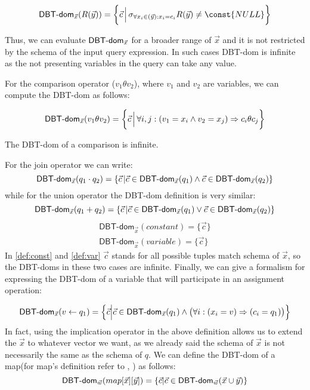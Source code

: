 \documentclass[12pt]{article}
\newcommand{\dom}{\textsf{DBT-dom}}
\begin{document}
\begin{equation}
\label{def:relation}
\dom{}_{\vec x}(R(\vec y))=\bigg\{\vec c\,\Big|\,\sigma_{\forall x_i\in(\vec{y}): x_{i}=c_{i}}R(\vec y)\not= \const{NULL}\bigg\}
\end{equation}

Thus, we can evaluate $\text{\dom}_{\vec{x}}$ for a broader range of $\vec{x}$ and it is not restricted by the schema of the input query expression. In such cases \dom{} is infinite as the not presenting variables in the query can take any value.

For the comparison operator ($v_{1}\theta v_{2}$), where $v_1$ and $v_2$ are variables, we can compute the \dom{} as follows:

\begin{equation}
\text{\dom{}}_{\vec{x}}(v_{1}\theta v_{2})=\bigg\{\vec{c}\,\Big|\,\forall i,j:(v_{1}=x_{i}\land v_{2}=x_{j})\Rightarrow c_{i}\theta c_{j}\bigg\}
\end{equation}

The \dom{} of a comparison is infinite.

For the join operator we can write:
\begin{equation}
\label{def:join}
\text{\dom{}}_{\vec{x}}(q_{1}\cdot q_{2})=\{\vec{c}\,|\vec{c}\in\text{\dom{}}_{\vec{x}}(q_{1})\land\vec{c}\in\text{\dom{}}_{\vec{x}}(q_{2})\}
\end{equation}
while for the union operator the \dom{} definition is very similar:
\begin{equation}
\label{def:plus}
\text{\dom{}}_{\vec{x}}(q_{1}+ q_{2})=\{\vec{c}\,|\vec{c}\in\text{\dom{}}_{\vec{x}}(q_{1})\lor\vec{c}\in\text{\dom{}}_{\vec{x}}(q_{2})\}
\end{equation}
\begin{eqnarray}
\dom{}_{\vec x}(constant)=\Big\{\vec c\Big\}\label{def:const}\\
\dom{}_{\vec x}(variable)=\Big\{\vec c\Big\}\label{def:var}
\end{eqnarray}
In \eqref{def:const} and \eqref{def:var}  $\vec{c}$ stands for all possible tuples match schema of $\vec{x}$, so the \dom{}s in these two cases are infinite. 
Finally, we can give a formalism for expressing the \dom{} of a variable that will participate in an assignment operation:

\begin{equation}
\label{assign2}
\text{\dom{}}_{\vec{x}}(v\gets q_{1})=\Big\{\vec{c}\Big|\vec{c}\in\text{\dom{}}_{\vec{x}}(q_{1})\land \big(\forall i: (x_{i}=v)\Rightarrow(c_{i}=q_{1})\big)\Big\}
\end{equation}
In fact, using the implication operator in the above definition allows us to extend the $\vec{x}$ to whatever vector we want, as we already said the schema of $\vec{x}$ is not necessarily the same as the schema of $q$. %
We can define the \dom{} of a map(for map's definition refer to \cite{1}, \cite{2}) as follows:
\begin{equation}
\label{def:map}
\text{\dom}_{\vec{w}}(map[\vec{x}][\vec{y}])=\{\vec{c}|\vec{c}\in\text{\dom}_{\vec{w}}(\vec{x}\cup\vec{y})\}
\end{equation}
\end{document}
